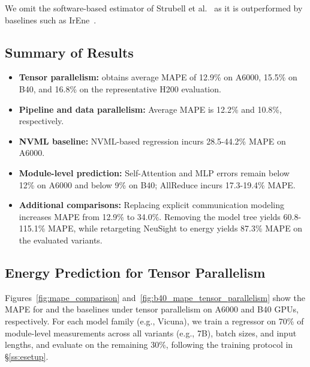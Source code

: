 We omit the software-based estimator of Strubell et al.~\cite{strubell19} as it is outperformed by baselines such as IrEne~\cite{irene}.


\subsection{Summary of Results}
\begin{itemize}[leftmargin=*,itemsep=0pt,topsep=0pt]
\item \textbf{Tensor parallelism:} \sys{} obtains average MAPE of 12.9\% on A6000, 15.5\% on B40, and 16.8\% on the representative H200 evaluation.
\item \textbf{Pipeline and data parallelism:} Average MAPE is 12.2\% and 10.8\%, respectively.
\item \textbf{NVML baseline:} NVML-based regression incurs 28.5-44.2\% MAPE on A6000.
\item \textbf{Module-level prediction:} Self-Attention and MLP errors remain below 12\% on A6000 and below 9\% on B40; AllReduce incurs 17.3-19.4\% MAPE.
\item \textbf{Additional comparisons:} Replacing explicit communication modeling increases MAPE from 12.9\% to 34.0\%. Removing the model tree yields 60.8-115.1\% MAPE, while retargeting NeuSight to energy yields 87.3\% MAPE on the evaluated variants.
\end{itemize}



\subsection{Energy Prediction for Tensor Parallelism}
\label{sec:model_prediction}
Figures~\ref{fig:mape_comparison} and~\ref{fig:b40_mape_tensor_parallelism} show the MAPE for \sys{} and the baselines under tensor parallelism on A6000 and B40 GPUs, respectively.
For each model family (e.g., Vicuna), we train a regressor on 70\% of module-level measurements across all variants (e.g., 7B), batch sizes, and input lengths, and evaluate on the remaining 30\%, following the training protocol in \S\ref{ss:esetup}.

